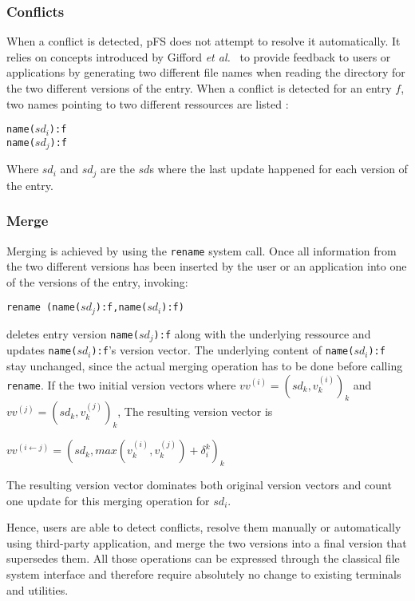 \subsubsection{Conflicts}

When a conflict is detected, pFS does not attempt to resolve it
automatically. It relies on concepts introduced by Gifford 
\emph{et al.}~\cite{gifford:sfs} 
to provide feedback to users or applications by generating two
different file names when reading the directory for the two different
versions of the entry. When a conflict is detected for an entry $f$,
two names pointing to two different ressources are listed : 
\begin{center}
{\tt name($sd_{i}$):f} \\
{\tt name($sd_{j}$):f}
\end{center}
Where $sd_{i}$ and $sd_{j}$ are the $sd$s where
the last update happened for each version of the entry.

\subsubsection{Merge}

Merging is achieved by using the {\tt rename} system call. Once all
information from the two different versions has been inserted by the
user or an application into one of the versions of the entry,
invoking:
\begin{center} 
{\tt rename (name($sd_{j}$):f,name($sd_{i}$):f)}
\end{center}
 deletes entry version {\tt name($sd_{j}$):f} along with the
 underlying ressource and updates 
{\tt name($sd_{i}$):f}'s version vector. The underlying content of 
{\tt name($sd_{i}$):f} stay unchanged, since the actual merging
operation has to be done before calling {\tt rename}.
If the two initial version vectors where
$vv^{(i)}=(sd_{k},v_{k}^{(i)})_{k}$ and
  $vv^{(j)}=(sd_{k},v_{k}^{(j)})_{k}$, The resulting version
vector is 
\begin{center}
$vv^{(i \leftarrow j)}=(sd_{k},
max(v_{k}^{(i)},v_{k}^{(j)}) + \delta _{i}^{k})_{k}$
\end{center}
The resulting version vector dominates both original version vectors
and count one update for this merging operation for $sd_{i}$.

Hence, users are able to detect conflicts, resolve them manually or
automatically using third-party application, and merge the two
versions into a final version that supersedes them. All those
operations can be expressed through the classical file
system interface and therefore require absolutely no change to
existing terminals and utilities.

